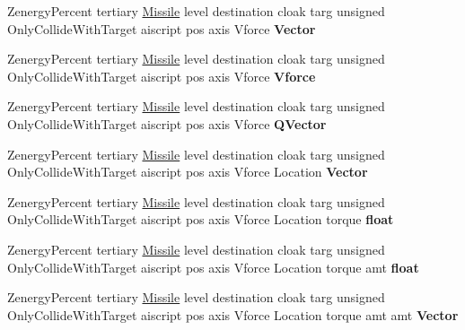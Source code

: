 \begin{DoxyCompactItemize}
\item 
Zenergy\+Percent tertiary \hyperlink{classMissile}{Missile} level destination cloak targ unsigned Only\+Collide\+With\+Target aiscript pos axis Vforce {\bfseries Vector}\hypertarget{classUnitWrapper_ace7a42817dcc29db469d782f1cab115d}{}\label{classUnitWrapper_ace7a42817dcc29db469d782f1cab115d}

\item 
Zenergy\+Percent tertiary \hyperlink{classMissile}{Missile} level destination cloak targ unsigned Only\+Collide\+With\+Target aiscript pos axis Vforce {\bfseries Vforce}\hypertarget{classUnitWrapper_a1148ef6b5d57311ecf865212c58244c2}{}\label{classUnitWrapper_a1148ef6b5d57311ecf865212c58244c2}

\item 
Zenergy\+Percent tertiary \hyperlink{classMissile}{Missile} level destination cloak targ unsigned Only\+Collide\+With\+Target aiscript pos axis Vforce {\bfseries Q\+Vector}\hypertarget{classUnitWrapper_a4bc9c5f4a29d6a7881e0e1b5565a34db}{}\label{classUnitWrapper_a4bc9c5f4a29d6a7881e0e1b5565a34db}

\item 
Zenergy\+Percent tertiary \hyperlink{classMissile}{Missile} level destination cloak targ unsigned Only\+Collide\+With\+Target aiscript pos axis Vforce Location {\bfseries Vector}\hypertarget{classUnitWrapper_a7ca878e7c08fd009fcf5162453e074c7}{}\label{classUnitWrapper_a7ca878e7c08fd009fcf5162453e074c7}

\item 
Zenergy\+Percent tertiary \hyperlink{classMissile}{Missile} level destination cloak targ unsigned Only\+Collide\+With\+Target aiscript pos axis Vforce Location torque {\bfseries float}\hypertarget{classUnitWrapper_a9f58a9abf5670a4213c43f4d3139ee1a}{}\label{classUnitWrapper_a9f58a9abf5670a4213c43f4d3139ee1a}

\item 
Zenergy\+Percent tertiary \hyperlink{classMissile}{Missile} level destination cloak targ unsigned Only\+Collide\+With\+Target aiscript pos axis Vforce Location torque amt {\bfseries float}\hypertarget{classUnitWrapper_af79945badeae4ff63a0bc520349e915a}{}\label{classUnitWrapper_af79945badeae4ff63a0bc520349e915a}

\item 
Zenergy\+Percent tertiary \hyperlink{classMissile}{Missile} level destination cloak targ unsigned Only\+Collide\+With\+Target aiscript pos axis Vforce Location torque amt amt {\bfseries Vector}\hypertarget{classUnitWrapper_a4026fb0bc9e3f65ad3f058458e3ccd9a}{}\label{classUnitWrapper_a4026fb0bc9e3f65ad3f058458e3ccd9a}


\end{DoxyCompactItemize}
